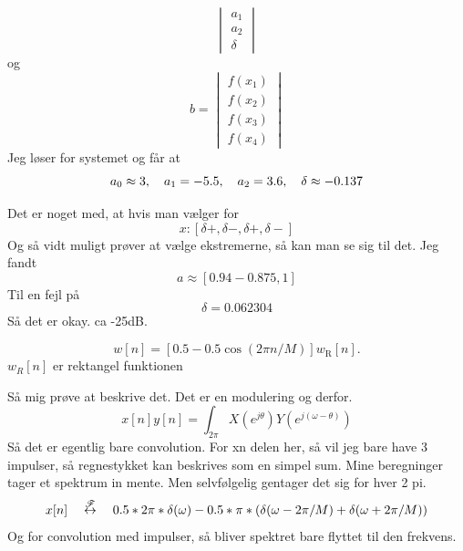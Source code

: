 \begin{Opgaver}
\begin{kapitel}
\begin{Opgave}
\begin{UnderOpgave}[Choose an initial set of m + 2 = 4 nodes \text{$\left[\zeta_{k}\right]_{k=0}^{3}$} as 0, 1/3, 2/3, and 1, ...]
\[\begin{vmatrix}
                    a_1 \\
                    a_2 \\
                    \delta 
                \end{vmatrix}\]
                og 
                \[b = 
                \begin{vmatrix}
                    f(x_1) \\
                    f(x_2) \\
                    f(x_3) \\
                    f(x_4) 
                \end{vmatrix}\]
                Jeg løser for systemet og får at 
                \[a_0 \approx 3, \tab{0} a_1 = -5.5, \tab{0} a_2 = 3.6, \tab{0} \delta \approx -0.137\]
            \end{UnderOpgave}
            \begin{UnderOpgave}
                Det er noget med, at hvis man vælger for 
                \[x : [\delta+, \delta-, \delta+, \delta-]\]
                Og så vidt muligt prøver at vælge ekstremerne, så kan man se sig til det. 
                Jeg fandt 
                \[a \approx [0.94 -0.875, 1]\]
                Til en fejl på 
                \[\delta = 0.062304\]
                Så det er okay. ca -25dB. 
            \end{UnderOpgave}
        \end{Opgave}
        \begin{Opgave}
            \[w[n]=[0.5-0.5\cos(2\pi n/M)]w_{\mathrm{R}}[n].\]     
            $w_R[n]$ er rektangel funktionen
            \begin{UnderOpgave}
                Så mig prøve at beskrive det. 
                Det er en modulering og derfor. 
                \[x[n]y[n] = \int_{2\pi}{X(e^{j\theta}) Y(e^{j (\omega - \theta)})}\]
                Så det er egentlig bare convolution. 
                For xn delen her, så vil jeg bare have 3 impulser, så regnestykket kan beskrives som en simpel sum. 
                Mine beregninger tager et spektrum in mente. Men selvfølgelig gentager det sig for hver 2 pi. 
                \[x[n] \transformation{F} 0.5 * 2\pi * \delta(\omega) - 0.5 * \pi * (\delta(\omega - 2\pi/M) + \delta(\omega + 2\pi/M))\]
                Og for convolution med impulser, så bliver spektret bare flyttet til den frekvens.

\end{UnderOpgave}
\end{Opgave}
\end{kapitel}
\end{Opgaver}
